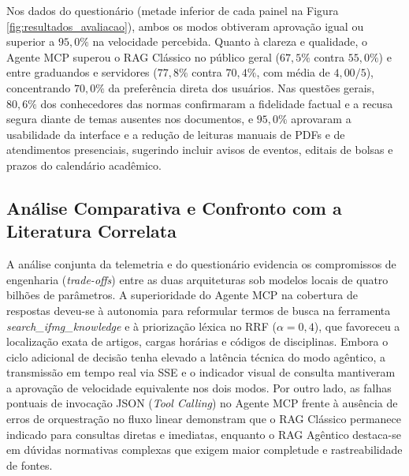 \documentclass[12pt]{article}
\begin{document}
Nos dados do questionário (metade inferior de cada painel na Figura \ref{fig:resultados_avaliacao}), ambos os modos obtiveram aprovação igual ou superior a $95,0\%$ na velocidade percebida. Quanto à clareza e qualidade, o Agente MCP superou o RAG Clássico no público geral ($67,5\%$ contra $55,0\%$) e entre graduandos e servidores ($77,8\%$ contra $70,4\%$, com média de $4,00/5$), concentrando $70,0\%$ da preferência direta dos usuários. Nas questões gerais, $80,6\%$ dos conhecedores das normas confirmaram a fidelidade factual e a recusa segura diante de temas ausentes nos documentos, e $95,0\%$ aprovaram a usabilidade da interface e a redução de leituras manuais de PDFs e de atendimentos presenciais, sugerindo incluir avisos de eventos, editais de bolsas e prazos do calendário acadêmico.

\FloatBarrier

\subsection{Análise Comparativa e Confronto com a Literatura Correlata}


A análise conjunta da telemetria e do questionário evidencia os compromissos de engenharia (\textit{trade-offs}) entre as duas arquiteturas sob modelos locais de quatro bilhões de parâmetros. A superioridade do Agente MCP na cobertura de respostas deveu-se à autonomia para reformular termos de busca na ferramenta \textit{search\_ifmg\_knowledge} e à priorização léxica no RRF ($\alpha = 0,4$), que favoreceu a localização exata de artigos, cargas horárias e códigos de disciplinas. Embora o ciclo adicional de decisão tenha elevado a latência técnica do modo agêntico, a transmissão em tempo real via SSE e o indicador visual de consulta mantiveram a aprovação de velocidade equivalente nos dois modos. Por outro lado, as falhas pontuais de invocação JSON (\textit{Tool Calling}) no Agente MCP frente à ausência de erros de orquestração no fluxo linear demonstram que o RAG Clássico permanece indicado para consultas diretas e imediatas, enquanto o RAG Agêntico destaca-se em dúvidas normativas complexas que exigem maior completude e rastreabilidade de fontes.
\end{document}
